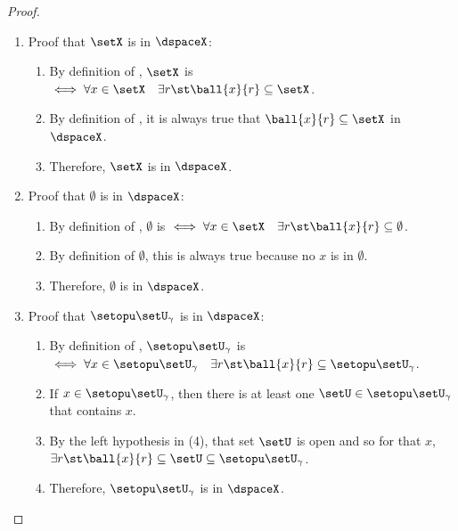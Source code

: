 \begin{proof}
\begin{enumerate}
  \item Proof that $\setX$ is  in $\dspaceX$:
    \begin{enumerate}
      \item By definition of  , 
            $\setX$ is  $\iff \forall x\in\setX \quad\exists r \st \ball{x}{r}\subseteq \setX$.
      \item By definition of  , it is always true that $\ball{x}{r}\subseteq\setX$ in $\dspaceX$.
      \item Therefore, $\setX$ is  in $\dspaceX$.
    \end{enumerate}

  \item Proof that $\emptyset$ is  in $\dspaceX$:
    \begin{enumerate}
      \item By definition of  , 
            $\emptyset$ is  $\iff \forall x\in\setX \quad\exists r \st \ball{x}{r}\subseteq \emptyset$.
      \item By definition of  $\emptyset$, %
            this is always true because no $x$ is in $\emptyset$.
      \item Therefore, $\emptyset$ is  in $\dspaceX$.
    \end{enumerate}

  \item Proof that $\setopu\setU_\gamma$ is  in $\dspaceX$:
    \begin{enumerate}
      \item By definition of  , 
            $\setopu\setU_\gamma$ is  $\iff \forall x\in\setopu\setU_\gamma \quad\exists r \st \ball{x}{r}\subseteq\setopu\setU_\gamma$.
      \item If $x\in\setopu\setU_\gamma$, then there is at least one $\setU\in\setopu\setU_\gamma$ that contains $x$.
      \item By the left hypothesis in (4), that set $\setU$ is open and so for that $x$,
            $\exists r \st \ball{x}{r}\subseteq\setU\subseteq\setopu\setU_\gamma$.
      \item Therefore, $\setopu\setU_\gamma$ is  in $\dspaceX$.
    \end{enumerate}


\end{enumerate}
\end{proof}
